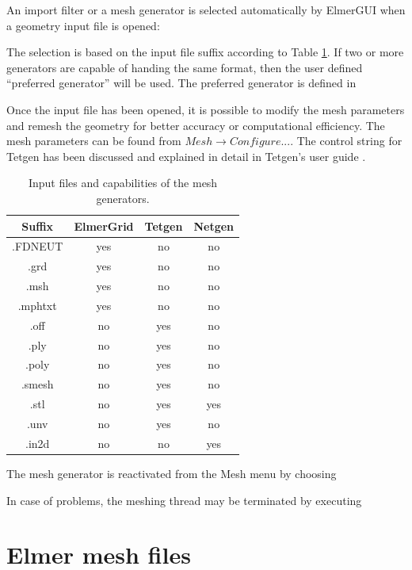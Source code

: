 An import filter or a mesh generator is selected automatically by ElmerGUI when a geometry
input file is opened:


The selection is based on the input file suffix according to Table \ref{table:inputfiles}. If two or more
generators are capable of handing the same format, then the user defined ``preferred
generator'' will be used. The preferred generator is defined in


Once the input file has been opened, it is possible to modify the mesh parameters
and remesh the geometry for better accuracy or computational efficiency. The mesh parameters
can be found from $Mesh \rightarrow Configure...$. The control string for Tetgen
has been discussed and explained in detail in Tetgen's user guide \cite{TetgenHome}.

\begin{table}
	\caption{Input files and capabilities of the mesh generators.}
	\label{table:inputfiles}
	\begin{center}
		\begin{tabular}{|c|c|c|c|}
		\hline
		 Suffix & ElmerGrid & Tetgen & Netgen \\
		\hline 
		.FDNEUT & yes & no & no \\
		.grd  & yes & no & no \\
		.msh & yes & no & no \\
		.mphtxt & yes & no & no \\
		.off & no & yes & no \\
		.ply & no & yes & no \\
		.poly & no & yes & no \\
		.smesh & no & yes & no \\
		.stl  & no & yes & yes \\
		.unv & no & yes & no \\
		.in2d & no & no & yes \\
		\hline
		\end{tabular}
	\end{center}
\end{table}

The mesh generator is reactivated from the Mesh menu by choosing

\noindent In case of problems, the meshing thread may be terminated by executing 

\section{Elmer mesh files}

